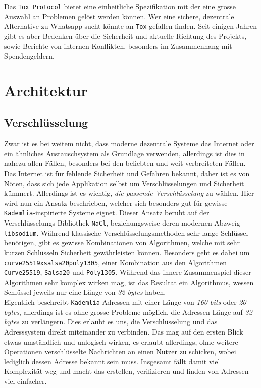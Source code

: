 \documentclass[11pt]{article}
\begin{document}
\noindent Das \texttt{Tox Protocol} bietet eine einheitliche Spezifikation mit
der eine grosse Auswahl an Problemen gelöst werden können. Wer eine
sichere, dezentrale Alternative zu Whatsapp sucht könnte an \texttt{Tox}
gefallen finden. Seit einigen Jahren gibt es aber Bedenken über die
Sicherheit und aktuelle Richtung des Projekts, sowie Berichte von
internen Konflikten, besonders im Zusammenhang mit Spendengeldern.
\section{Architektur}
\label{sec:orgb0dc1b4}
\subsection{Verschlüsselung}
\label{sec:org8a355cf}
Zwar ist es bei weitem nicht, dass moderne dezentrale Systeme das
Internet oder ein ähnliches Austauschsystem als Grundlage verwenden,
allerdings ist dies in nahezu allen Fällen, besonders bei den
beliebten und weit verbreiteten Fällen. Das Internet ist für fehlende
Sicherheit und Gefahren bekannt, daher ist es von Nöten, dass sich
jede Applikation selbst um Verschlüsselungen und Sicherheit kümmert.
Allerdings ist es wichtig, \emph{die passende Verschlüsselung} zu wählen.
Hier wird nun ein Ansatz beschrieben, welcher sich besonders gut für
gewisse \texttt{Kademlia}-inspirierte Systeme eignet. Dieser Ansatz beruht auf
der Verschlüsselungs-Bibliothek \texttt{NaCl}, beziehungsweise deren modernen
Abzweig \texttt{libsodium}. Während klassische Verschlüsselungsmethoden sehr
lange Schlüssel benötigen, gibt es gewisse Kombinationen von
Algorithmen, welche mit sehr kurzen Schlüsseln Sicherheit
gewährleisten können. Besonders geht es dabei um
\texttt{curve25519xsalsa20poly1305}, einer Kombination aus den Algorithmen
\texttt{Curve25519}, \texttt{Salsa20} und \texttt{Poly1305}. Während das innere Zusammenspiel
dieser Algorithmen sehr komplex wirken mag, ist das Resultat ein
Algorithmus, wessen Schlüssel jeweils nur eine Länge von \emph{32 bytes}
haben.\\

\noindent Eigentlich beschreibt \texttt{Kademlia} Adressen mit einer Länge von
\emph{160 bits} oder \emph{20 bytes}, allerdings ist es ohne grosse Probleme
möglich, die Adressen Länge auf \emph{32 bytes} zu verlängern. Dies erlaubt
es uns, die Verschlüsselung und das Adresssystem direkt miteinander zu
verbinden. Das mag auf den ersten Blick etwas umständlich und
unlogisch wirken, es erlaubt allerdings, ohne weitere Operationen
verschlüsselte Nachrichten an einen Nutzer zu schicken, wobei
lediglich dessen Adresse bekannt sein muss. Insgesamt fällt damit viel
Komplexität weg und macht das erstellen, verifizieren und finden von
Adressen viel einfacher.
\end{document}
